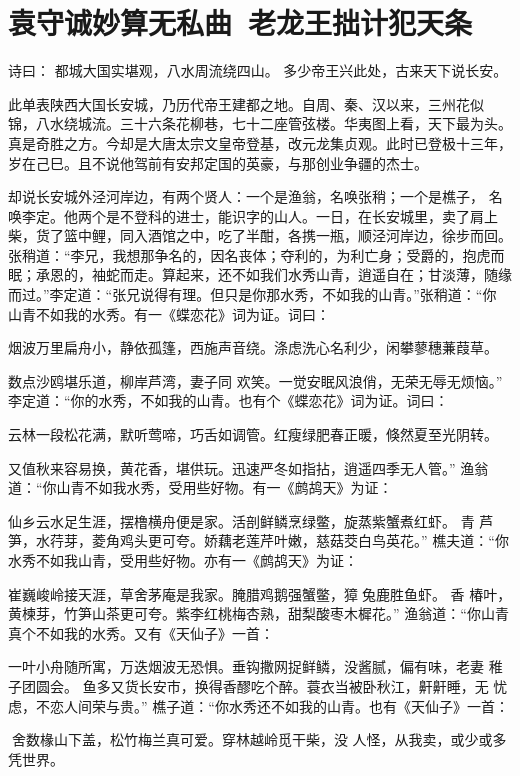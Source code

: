 \chapter{袁守诚妙算无私曲~老龙王拙计犯天条}

诗曰：
都城大国实堪观，八水周流绕四山。
多少帝王兴此处，古来天下说长安。

此单表陕西大国长安城，乃历代帝王建都之地。自周、秦、汉以来，三州花似
锦，八水绕城流。三十六条花柳巷，七十二座管弦楼。华夷图上看，天下最为头。
真是奇胜之方。今却是大唐太宗文皇帝登基，改元龙集贞观。此时已登极十三年，
岁在己巳。且不说他驾前有安邦定国的英豪，与那创业争疆的杰士。

却说长安城外泾河岸边，有两个贤人：一个是渔翁，名唤张稍；一个是樵子，
名唤李定。他两个是不登科的进士，能识字的山人。一日，在长安城里，卖了肩上
柴，货了篮中鲤，同入酒馆之中，吃了半酣，各携一瓶，顺泾河岸边，徐步而回。
张稍道：“李兄，我想那争名的，因名丧体；夺利的，为利亡身；受爵的，抱虎而
眠；承恩的，袖蛇而走。算起来，还不如我们水秀山青，逍遥自在；甘淡薄，随缘
而过。”李定道：“张兄说得有理。但只是你那水秀，不如我的山青。”张稍道：“你
山青不如我的水秀。有一《蝶恋花》词为证。词曰：

烟波万里扁舟小，静依孤篷，西施声音绕。涤虑洗心名利少，闲攀蓼穗蒹葭草。

数点沙鸥堪乐道，柳岸芦湾，妻子同
欢笑。一觉安眠风浪俏，无荣无辱无烦恼。”
李定道：“你的水秀，不如我的山青。也有个《蝶恋花》词为证。词曰：

云林一段松花满，默听莺啼，巧舌如调管。红瘦绿肥春正暖，倏然夏至光阴转。

又值秋来容易换，黄花香，堪供玩。迅速严冬如指拈，逍遥四季无人管。”
渔翁道：“你山青不如我水秀，受用些好物。有一《鹧鸪天》为证：

仙乡云水足生涯，摆橹横舟便是家。活剖鲜鳞烹绿鳖，旋蒸紫蟹煮红虾。
青
芦笋，水荇芽，菱角鸡头更可夸。娇藕老莲芹叶嫩，慈菇茭白鸟英花。”
樵夫道：“你水秀不如我山青，受用些好物。亦有一《鹧鸪天》为证：

崔巍峻岭接天涯，草舍茅庵是我家。腌腊鸡鹅强蟹鳖，獐兔鹿胜鱼虾。
香
椿叶，黄楝芽，竹笋山茶更可夸。紫李红桃梅杏熟，甜梨酸枣木樨花。”
渔翁道：“你山青真个不如我的水秀。又有《天仙子》一首：

一叶小舟随所寓，万迭烟波无恐惧。垂钩撒网捉鲜鳞，没酱腻，偏有味，老妻
稚子团圆会。
鱼多又货长安市，换得香醪吃个醉。蓑衣当被卧秋江，鼾鼾睡，无
忧虑，不恋人间荣与贵。”
樵子道：“你水秀还不如我的山青。也有《天仙子》一首：

舍数椽山下盖，松竹梅兰真可爱。穿林越岭觅干柴，没
人怪，从我卖，或少或多凭世界。

